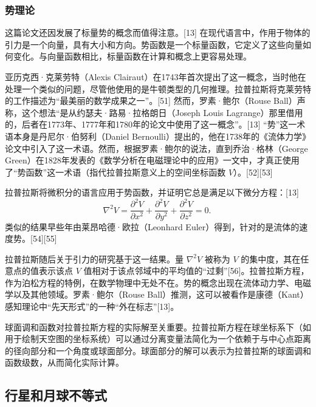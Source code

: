 \subsubsection{势理论}  
这篇论文还因发展了标量势的概念而值得注意。[13] 在现代语言中，作用于物体的引力是一个向量，具有大小和方向。势函数是一个标量函数，它定义了这些向量如何变化。与向量函数相比，标量函数在计算和概念上更容易处理。

亚历克西·克莱劳特（Alexis Clairaut）在1743年首次提出了这一概念，当时他在处理一个类似的问题，尽管他使用的是牛顿类型的几何推理。拉普拉斯将克莱劳特的工作描述为“最美丽的数学成果之一”。[51] 然而，罗素·鲍尔（Rouse Ball）声称，这个想法“是从约瑟夫·路易·拉格朗日（Joseph Louis Lagrange）那里借用的，后者在1773年、1777年和1780年的论文中使用了这一概念”。[13] “势”这一术语本身是丹尼尔·伯努利（Daniel Bernoulli）提出的，他在1738年的《流体力学》论文中引入了这一术语。然而，根据罗素·鲍尔的说法，直到乔治·格林（George Green）在1828年发表的《数学分析在电磁理论中的应用》一文中，才真正使用了“势函数”这一术语（指代拉普拉斯意义上的空间坐标函数 \( V \)）。[52][53]

拉普拉斯将微积分的语言应用于势函数，并证明它总是满足以下微分方程：[13]
\[
\nabla^2 V = \frac{\partial^2 V}{\partial x^2} + \frac{\partial^2 V}{\partial y^2} + \frac{\partial^2 V}{\partial z^2} = 0.~
\]
类似的结果早些年由莱昂哈德·欧拉（Leonhard Euler）得到，针对的是流体的速度势。[54][55]

拉普拉斯随后关于引力的研究基于这一结果。量 \(\nabla^2 V\) 被称为 \(V\) 的集中度，其在任意点的值表示该点 \(V\) 值相对于该点邻域中的平均值的“过剩”[56]。拉普拉斯方程，作为泊松方程的特例，在数学物理中无处不在。势的概念出现在流体动力学、电磁学以及其他领域。罗素·鲍尔（Rouse Ball）推测，这可以被看作是康德（Kant）感知理论中“先天形式”的一种“外在标志”[13]。

球面调和函数对拉普拉斯方程的实际解至关重要。拉普拉斯方程在球坐标系下（如用于绘制天空图的坐标系统）可以通过分离变量法简化为一个依赖于与中心点距离的径向部分和一个角度或球面部分。球面部分的解可以表示为拉普拉斯的球面调和函数级数，从而简化实际计算。
\subsection{行星和月球不等式}
